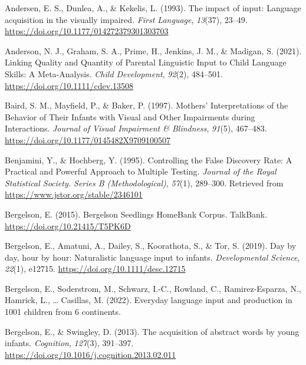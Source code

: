 \documentclass[
  man]{apa6}
\newlength{\cslhangindent}
\newlength{\cslentryspacingunit} %
\newenvironment{CSLReferences}[2] %
 {%
  \setlength{\parindent}{0pt}
  \ifodd #1
  \let\oldpar\par
  \def\par{\hangindent=\cslhangindent\oldpar}
  \fi
  \setlength{\parskip}{#2\cslentryspacingunit}
 }%
 {}
\begin{document}
\hypertarget{refs}{}
\begin{CSLReferences}{1}{0}
\leavevmode{}%
Andersen, E. S., Dunlea, A., \& Kekelis, L. (1993). The impact of input: Language acquisition in the visually impaired. \emph{First Language}, \emph{13}(37), 23--49. \url{https://doi.org/10.1177/014272379301303703}

\leavevmode{}%
Anderson, N. J., Graham, S. A., Prime, H., Jenkins, J. M., \& Madigan, S. (2021). Linking {Quality} and {Quantity} of {Parental Linguistic Input} to {Child Language Skills}: {A Meta-Analysis}. \emph{Child Development}, \emph{92}(2), 484--501. \url{https://doi.org/10.1111/cdev.13508}

\leavevmode{}%
Baird, S. M., Mayfield, P., \& Baker, P. (1997). Mothers' {Interpretations} of the {Behavior} of {Their Infants} with {Visual} and {Other Impairments} during {Interactions}. \emph{Journal of Visual Impairment \& Blindness}, \emph{91}(5), 467--483. \url{https://doi.org/10.1177/0145482X9709100507}

\leavevmode{}%
Benjamini, Y., \& Hochberg, Y. (1995). Controlling the {False Discovery Rate}: {A Practical} and {Powerful Approach} to {Multiple Testing}. \emph{Journal of the Royal Statistical Society. Series B (Methodological)}, \emph{57}(1), 289--300. Retrieved from \url{https://www.jstor.org/stable/2346101}

\leavevmode{}%
Bergelson, E. (2015). Bergelson {Seedlings HomeBank Corpus}. {TalkBank}. \url{https://doi.org/10.21415/T5PK6D}

\leavevmode{}%
Bergelson, E., Amatuni, A., Dailey, S., Koorathota, S., \& Tor, S. (2019). Day by day, hour by hour: {Naturalistic} language input to infants. \emph{Developmental Science}, \emph{22}(1), e12715. \url{https://doi.org/10.1111/desc.12715}

\leavevmode{}%
Bergelson, E., Soderstrom, M., Schwarz, I.-C., Rowland, C., Ramirez-Esparza, N., Hamrick, L., \ldots{} Casillas, M. (2022). Everyday language input and production in 1001 children from 6 continents.

\leavevmode{}%
Bergelson, E., \& Swingley, D. (2013). The acquisition of abstract words by young infants. \emph{Cognition}, \emph{127}(3), 391--397. \url{https://doi.org/10.1016/j.cognition.2013.02.011}


\end{CSLReferences}
\end{document}
